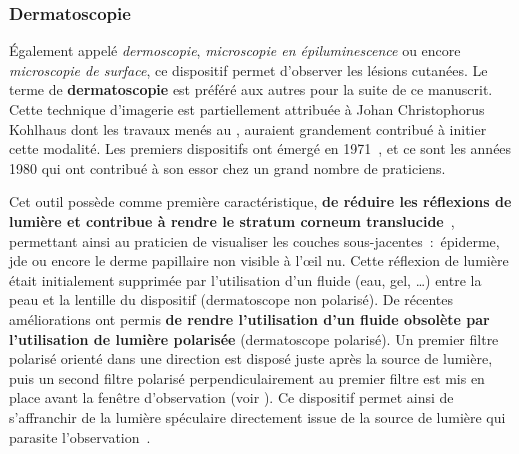 \subsubsection{Dermatoscopie}
Également appelé \textit{dermoscopie}, \textit{microscopie en épiluminescence} ou encore \textit{microscopie de surface}, ce dispositif permet d’observer les lésions cutanées. Le terme de \textbf{dermatoscopie} est préféré aux autres pour la suite de ce manuscrit. Cette technique d’imagerie est partiellement attribuée à Johan Christophorus Kohlhaus dont les travaux menés au , auraient grandement contribué à initier cette modalité. Les premiers dispositifs ont émergé en 1971~\cite{MacKie1972}, et ce sont les années 1980 qui ont contribué à son essor chez un grand nombre de praticiens.\par

Cet outil possède comme première caractéristique, \textbf{de réduire les réflexions de lumière et contribue à rendre le stratum corneum translucide}~\cite{Katz2001}, permettant ainsi au praticien de visualiser les couches sous-jacentes~:~épiderme, \gls{jde} ou encore le derme papillaire non visible à l’œil nu. Cette réflexion de lumière était initialement supprimée par l’utilisation d’un fluide (eau, gel, \ldots) entre la peau et la lentille du dispositif (dermatoscope non polarisé). De récentes améliorations ont permis \textbf{de rendre l'utilisation d'un fluide obsolète par l'utilisation de lumière polarisée} (dermatoscope polarisé). Un premier filtre polarisé orienté dans une direction est disposé juste après la source de lumière, puis un second filtre polarisé perpendiculairement au premier filtre est mis en place avant la fenêtre d'observation (voir ). Ce dispositif permet ainsi de s'affranchir de la lumière spéculaire directement issue de la source de lumière qui parasite l'observation~\cite{CamposdoCarmo2008}.\par

